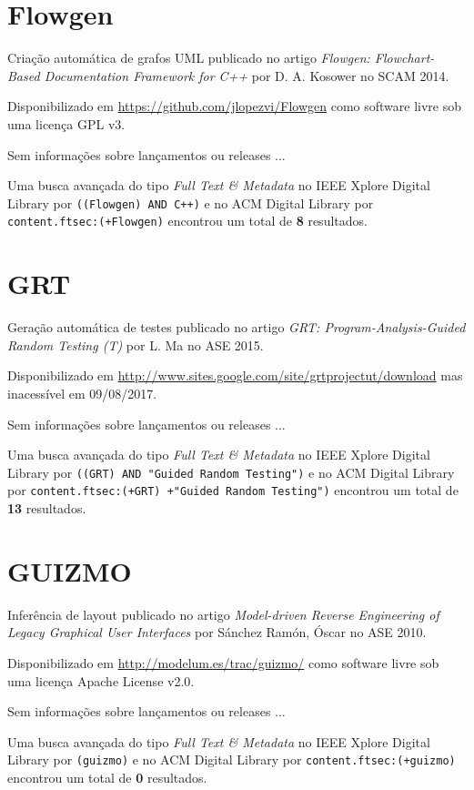 \section{Flowgen}

Criação automática de grafos UML
publicado no artigo {\it Flowgen: Flowchart-Based Documentation Framework for C++}
por D. A. Kosower
no SCAM 2014.

Disponibilizado em \url{https://github.com/jlopezvi/Flowgen}
como software livre
sob uma licença GPL v3.

Sem informações sobre lançamentos ou releases ...


Uma busca avançada do tipo {\it Full Text \& Metadata} no IEEE Xplore Digital Library por
\texttt{((Flowgen) AND C++)}
e no ACM Digital Library por
\texttt{content.ftsec:(+Flowgen)}
encontrou um total de
{\bf 8}
resultados.

\section{GRT}

Geração automática de testes
publicado no artigo {\it GRT: Program-Analysis-Guided Random Testing (T)}
por L. Ma
no ASE 2015.

Disponibilizado em \url{http://www.sites.google.com/site/grtprojectut/download}
mas inacessível em 09/08/2017.

Sem informações sobre lançamentos ou releases ...


Uma busca avançada do tipo {\it Full Text \& Metadata} no IEEE Xplore Digital Library por
\texttt{((GRT) AND "Guided Random Testing")}
e no ACM Digital Library por
\texttt{content.ftsec:(+GRT) +"Guided Random Testing")}
encontrou um total de
{\bf 13}
resultados.

\section{GUIZMO}

Inferência de layout
publicado no artigo {\it Model-driven Reverse Engineering of Legacy Graphical User Interfaces}
por S\'{a}nchez Ram\'{o}n, \'{O}scar
no ASE 2010.

Disponibilizado em \url{http://modelum.es/trac/guizmo/}
como software livre
sob uma licença Apache License v2.0.

Sem informações sobre lançamentos ou releases ...


Uma busca avançada do tipo {\it Full Text \& Metadata} no IEEE Xplore Digital Library por
\texttt{(guizmo)}
e no ACM Digital Library por
\texttt{content.ftsec:(+guizmo)}
encontrou um total de
{\bf 0}
resultados.

